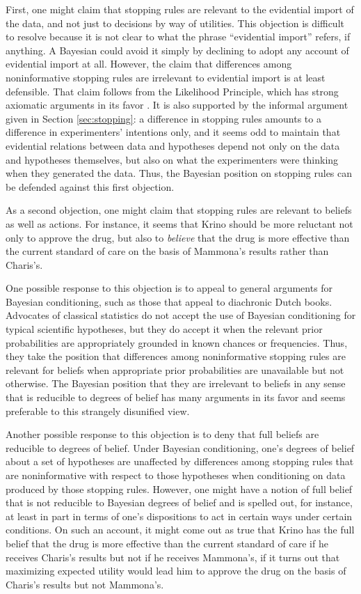 \documentclass{article}
\theoremstyle{definition}
\begin{document}
First, one might claim that stopping rules are relevant to the evidential import of the data, and not just to decisions by way of utilities.
This objection is difficult to resolve because it is not clear to what the phrase ``evidential import'' refers, if anything.
A Bayesian could avoid it simply by declining to adopt any account of evidential import at all.
However, the claim that differences among noninformative stopping rules are irrelevant to evidential import is at least defensible.
That claim follows from the Likelihood Principle, which has strong axiomatic arguments in its favor \citep{birnbaum62,berger+wolpert88,gandenberger15}.
It is also supported by the informal argument given in Section \ref{sec:stopping}: a difference in stopping rules amounts to a difference in experimenters' intentions only, and it seems odd to maintain that evidential relations between data and hypotheses depend not only on the data and hypotheses themselves, but also on what the experimenters were thinking when they generated the data.
Thus, the Bayesian position on stopping rules can be defended against this first objection.

As a second objection, one might claim that stopping rules are relevant to beliefs as well as actions.
For instance, it seems that Krino should be more reluctant not only to approve the drug, but also to \textit{believe} that the drug is more effective than the current standard of care on the basis of Mammona's results rather than Charis's.

One possible response to this objection is to appeal to general arguments for Bayesian conditioning, such as those that appeal to diachronic Dutch books.
Advocates of classical statistics do not accept the use of Bayesian conditioning for typical scientific hypotheses, but they do accept it when the relevant prior probabilities are appropriately grounded in known chances or frequencies.
Thus, they take the position that differences among noninformative stopping rules are relevant for beliefs when appropriate prior probabilities are unavailable but not otherwise.
The Bayesian position that they are irrelevant to beliefs in any sense that is reducible to degrees of belief has many arguments in its favor and seems preferable to this strangely disunified view.

Another possible response to this objection is to deny that full beliefs are reducible to degrees of belief.
Under Bayesian conditioning, one's degrees of belief about a set of hypotheses are unaffected by differences among stopping rules that are noninformative with respect to those hypotheses when conditioning on data produced by those stopping rules.
However, one might have a notion of full belief that is not reducible to Bayesian degrees of belief and is spelled out, for instance, at least in part in terms of one's dispositions to act in certain ways under certain conditions.
On such an account, it might come out as true that Krino has the full belief that the drug is more effective than the current standard of care if he receives Charis's results but not if he receives Mammona's, if it turns out that maximizing expected utility would lead him to approve the drug on the basis of Charis's results but not Mammona's.
\end{document}
